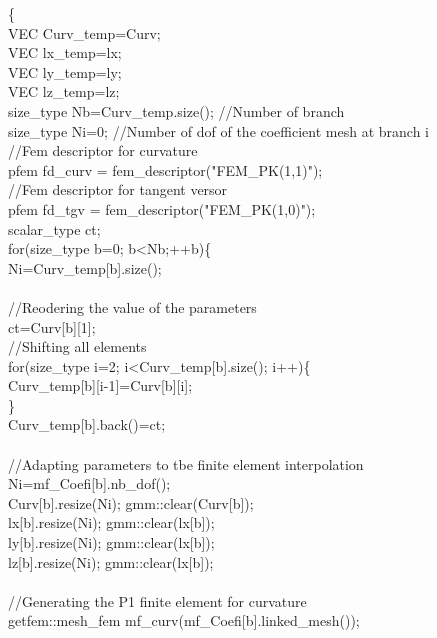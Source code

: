 \documentclass[a4paper]{report}
\newcommand\tab[1][1cm]{\hspace*{#1}}
\begin{document}
{\{\\
\tab	VEC Curv\_\-temp=Curv;\\
\tab	VEC lx\_\-temp=lx;\\
\tab	VEC ly\_\-temp=ly;\\
\tab	VEC lz\_\-temp=lz;\\
\tab	size\_\-type Nb=Curv\_\-temp.size(); //Number of branch\\
\tab	size\_\-type Ni=0; //Number of dof of the coefficient mesh at branch i\\
\tab    //Fem descriptor for curvature\\
\tab	pfem fd\_\-curv = fem\_\-descriptor("FEM\_\-PK(1,1)");\\
\tab   //Fem descriptor for tangent versor\\
\tab	pfem fd\_\-tgv  = fem\_\-descriptor("FEM\_\-PK(1,0)"); \\
\tab	scalar\_\-type ct;\\
\tab	for(size\_\-type b=0; b<Nb;++b)\{\\
\tab\tab	Ni=Curv\_\-temp[b].size();\\
	\\
\tab\tab		//Reodering the value of the parameters\\
\tab\tab		ct=Curv[b][1];\\
\tab\tab		   //Shifting all elements\\
\tab\tab		for(size\_\-type i=2; i<Curv\_\-temp[b].size(); i++)\{\\
\tab\tab\tab			Curv\_\-temp[b][i-1]=Curv[b][i];\\
\tab\tab		\}\\
\tab\tab		Curv\_\-temp[b].back()=ct;\\
\\
\tab\tab		//Adapting parameters to tbe finite element interpolation\\
\tab\tab		Ni=mf\_\-Coefi[b].nb\_\-dof();\\
\tab\tab		Curv[b].resize(Ni); gmm::clear(Curv[b]);\\
\tab\tab		 lx[b].resize(Ni);  gmm::clear(lx[b]);\\
\tab\tab		 ly[b].resize(Ni);  gmm::clear(lx[b]);\\
\tab\tab		 lz[b].resize(Ni);  gmm::clear(lx[b]);\\
\\		
\tab\tab		//Generating the P1 finite element for curvature\\
\tab\tab		getfem::mesh\_\-fem mf\_\-curv(mf\_\-Coefi[b].linked\_\-mesh());\\
}
\end{document}
